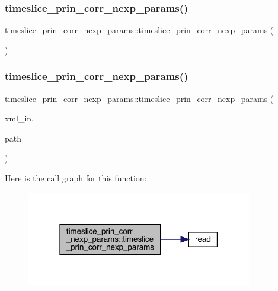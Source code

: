 \subsubsection{\texorpdfstring{timeslice\_prin\_corr\_nexp\_params()}{timeslice\_prin\_corr\_nexp\_params()}\hspace{0.1cm}{\footnotesize\ttfamily [1/4]}}
{\footnotesize\ttfamily timeslice\+\_\+prin\+\_\+corr\+\_\+nexp\+\_\+params\+::timeslice\+\_\+prin\+\_\+corr\+\_\+nexp\+\_\+params (\begin{DoxyParamCaption}{ }\end{DoxyParamCaption})\hspace{0.3cm}{\ttfamily [inline]}}

\mbox{\label{structtimeslice__prin__corr__nexp__params_a8da16318e00097acfaa68885897adb52}} 
\subsubsection{\texorpdfstring{timeslice\_prin\_corr\_nexp\_params()}{timeslice\_prin\_corr\_nexp\_params()}\hspace{0.1cm}{\footnotesize\ttfamily [2/4]}}
{\footnotesize\ttfamily timeslice\+\_\+prin\+\_\+corr\+\_\+nexp\+\_\+params\+::timeslice\+\_\+prin\+\_\+corr\+\_\+nexp\+\_\+params (\begin{DoxyParamCaption}\item[{X\+M\+L\+Reader \&}]{xml\+\_\+in,  }\item[{const string \&}]{path }\end{DoxyParamCaption})}

Here is the call graph for this function\+:
\nopagebreak
\begin{figure}[H]
\begin{center}
\leavevmode
\includegraphics[width=279pt]{de/d10/structtimeslice__prin__corr__nexp__params_a8da16318e00097acfaa68885897adb52_cgraph}
\end{center}
\end{figure}
\mbox{\label{structtimeslice__prin__corr__nexp__params_aa73481d060cb2941fa63418415d873f2}} 
